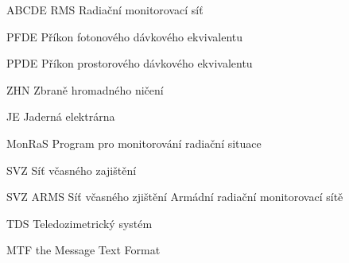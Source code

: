 \begin{seznamzkratek}{ABCDE}
	      {RMS}
	      {Radiační monitorovací síť}	  
	     	  
	      {PFDE}
	      {Příkon fotonového dávkového ekvivalentu}
	     	  
	      {PPDE}
	      {Příkon prostorového dávkového ekvivalentu}
	     	  
	      {ZHN}
	      {Zbraně hromadného ničení}
	     	     	  
	      {JE}
	      {Jaderná elektrárna}
	     	  
	      {MonRaS}
	      {Program pro monitorování radiační situace}
	     	  
	      {SVZ}
	      {Síť včasného zajištění}
	     	  
	      {SVZ ARMS}
	      {Síť včasného zjištění Armádní radiační monitorovací sítě}
	      
	      {TDS}
	      {Teledozimetrický systém}	   
	      
	      {MTF}
	      {the Message Text Format}	         
	      	            	      

\end{seznamzkratek}